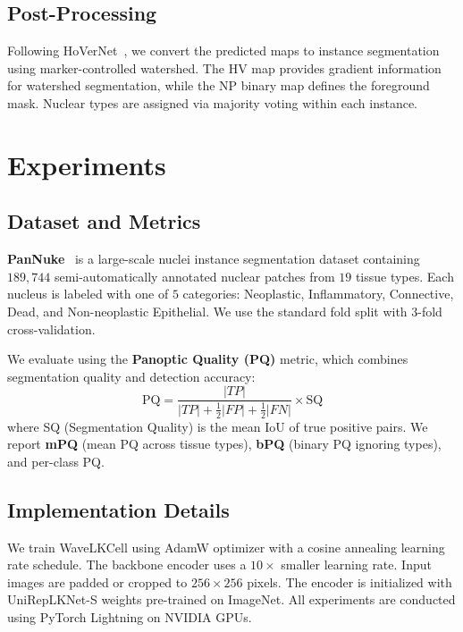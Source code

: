 \documentclass[conference]{IEEEtran}
\begin{document}
\subsection{Post-Processing}

Following HoVerNet~\cite{hoevernet}, we convert the predicted maps to instance segmentation using marker-controlled watershed. The HV map provides gradient information for watershed segmentation, while the NP binary map defines the foreground mask. Nuclear types are assigned via majority voting within each instance.

\section{Experiments}
\label{sec:exp}

\subsection{Dataset and Metrics}

\textbf{PanNuke}~\cite{pannuke} is a large-scale nuclei instance segmentation dataset containing $189{,}744$ semi-automatically annotated nuclear patches from $19$ tissue types. Each nucleus is labeled with one of $5$ categories: Neoplastic, Inflammatory, Connective, Dead, and Non-neoplastic Epithelial. We use the standard fold split with 3-fold cross-validation.

We evaluate using the \textbf{Panoptic Quality (PQ)} metric, which combines segmentation quality and detection accuracy:
\begin{equation}
    \text{PQ} = \frac{|TP|}{|TP| + \frac{1}{2}|FP| + \frac{1}{2}|FN|} \times \text{SQ}
\end{equation}
where SQ (Segmentation Quality) is the mean IoU of true positive pairs. We report \textbf{mPQ} (mean PQ across tissue types), \textbf{bPQ} (binary PQ ignoring types), and per-class PQ.

\subsection{Implementation Details}

We train WaveLKCell using AdamW optimizer with a cosine annealing learning rate schedule. The backbone encoder uses a $10\times$ smaller learning rate. Input images are padded or cropped to $256{\times}256$ pixels. The encoder is initialized with UniRepLKNet-S weights pre-trained on ImageNet. All experiments are conducted using PyTorch Lightning on NVIDIA GPUs.
\end{document}
